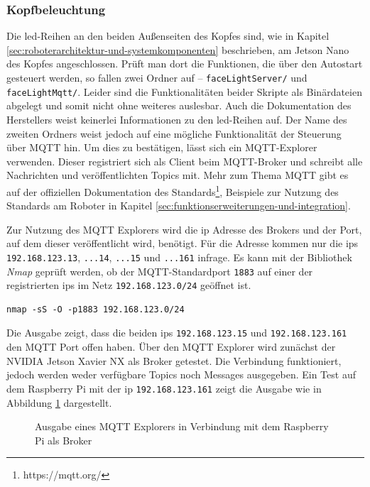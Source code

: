 \subsubsection{Kopfbeleuchtung}
\label{subsubsec:led}

Die \gls{led}-Reihen an den beiden Außenseiten des Kopfes sind, wie in Kapitel \ref{sec:roboterarchitektur-und-systemkomponenten}
beschrieben, am Jetson Nano des Kopfes angeschlossen.
Prüft man dort die Funktionen, die über den Autostart gesteuert werden, so fallen zwei Ordner auf -- \texttt{faceLightServer/}
und \texttt{faceLightMqtt/}.
Leider sind die Funktionalitäten beider Skripte als Binärdateien abgelegt und somit nicht ohne weiteres auslesbar.
Auch die Dokumentation des Herstellers weist keinerlei Informationen zu den \gls{led}-Reihen auf.
Der Name des zweiten Ordners weist jedoch auf eine mögliche Funktionalität der Steuerung über MQTT hin.
Um dies zu bestätigen, lässt sich ein MQTT-Explorer verwenden.
Dieser registriert sich als Client beim MQTT-Broker und schreibt alle Nachrichten und veröffentlichten Topics mit.
Mehr zum Thema MQTT gibt es auf der offiziellen Dokumentation des Standards\footnote{https://mqtt.org/}, Beispiele zur Nutzung
des Standards am Roboter in Kapitel \ref{sec:funktionserweiterungen-und-integration}.

Zur Nutzung des MQTT Explorers wird die \gls{ip} Adresse des Brokers und der Port, auf dem dieser veröffentlicht wird, benötigt.
Für die Adresse kommen nur die \glspl{ip} \texttt{192.168.123.13}, \texttt{...14}, \texttt{...15} und \texttt{...161}
infrage.
Es kann mit der Bibliothek \emph{Nmap} geprüft werden, ob der MQTT-Standardport \texttt{1883} auf einer der registrierten \glspl{ip}
im Netz \texttt{192.168.123.0/24} geöffnet ist.

\begin{lstlisting}
nmap -sS -O -p1883 192.168.123.0/24
\end{lstlisting}

\noindent Die Ausgabe zeigt, dass die beiden \glspl{ip}
\texttt{192\allowbreak .168\allowbreak .123\allowbreak .15} und \texttt{192\allowbreak .168\allowbreak .123\allowbreak .161} den MQTT Port offen haben.
Über den MQTT Explorer wird zunächst der NVIDIA Jetson Xavier NX als Broker getestet.
Die Verbindung funktioniert, jedoch werden weder verfügbare Topics noch Messages ausgegeben.
Ein Test auf dem Raspberry Pi mit der \gls{ip} \texttt{192.168.123.161} zeigt die Ausgabe wie in Abbildung \ref{fig:mqtt-explorer}
dargestellt.

\begin{figure}[h]
    \caption{Ausgabe eines MQTT Explorers in Verbindung mit dem Raspberry Pi als Broker}\label{fig:mqtt-explorer}
\end{figure}


